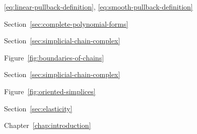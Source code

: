 \par\noindent\hspace*{0em}\label{index:pullback}\quad \eqref{eq:linear-pullback-definition}, \eqref{eq:smooth-pullback-definition}

\par\noindent\hspace*{0em}\label{index:shape-functions}\quad Section~\ref{sec:complete-polynomial-forms}

\par\noindent\hspace*{0em}\label{index:simplex}\quad Section~\ref{sec:simplicial-chain-complex}

\par\noindent\hspace*{1em}\label{index:simplex-boundary-of}\quad Figure~\ref{fig:boundaries-of-chains}

\par\noindent\hspace*{1em}\label{index:simplex-face}\quad Section~\ref{sec:simplicial-chain-complex}

\par\noindent\hspace*{1em}\label{index:simplex-orientation}\quad Figure~\ref{fig:oriented-simplices}

\par\noindent\hspace*{0em}\label{index:st-venant-operator}\quad Section~\ref{sec:elasticity}

\par\noindent\hspace*{0em}\label{index:stiffness-matrix}\quad Chapter~\ref{chap:introduction}

